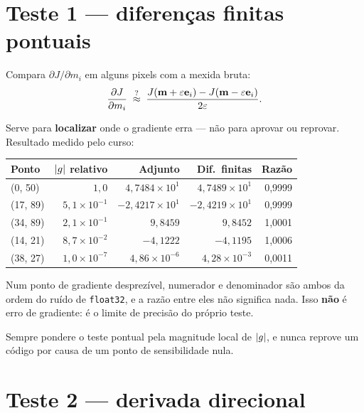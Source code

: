 \documentclass[11pt,a4paper,oneside]{report}
\begin{document}
\section{Teste 1 --- diferen\c{c}as finitas pontuais}

Compara $\partial J/\partial m_i$ em alguns pixels com a mexida bruta:
\begin{equation}
\frac{\partial J}{\partial m_i} \;\stackrel{?}{\approx}\;
\frac{J(\mathbf{m} + \varepsilon\mathbf{e}_i) - J(\mathbf{m} - \varepsilon\mathbf{e}_i)}
     {2\varepsilon}.
\end{equation}

Serve para \textbf{localizar} onde o gradiente erra --- n\~ao para aprovar ou
reprovar. Resultado medido pelo curso:

\begin{center}
\begin{tabular}{@{}lrrrr@{}}
\toprule
\textbf{Ponto} & $\lvert g \rvert$ relativo & \textbf{Adjunto} & \textbf{Dif.\ finitas}
& \textbf{Raz\~ao} \\
\midrule
(0, 50)  & $1{,}0$              & $4{,}7484\times10^{1}$  & $4{,}7489\times10^{1}$  & 0{,}9999 \\
(17, 89) & $5{,}1\times10^{-1}$ & $-2{,}4217\times10^{1}$ & $-2{,}4219\times10^{1}$ & 0{,}9999 \\
(34, 89) & $2{,}1\times10^{-1}$ & $9{,}8459$              & $9{,}8452$              & 1{,}0001 \\
(14, 21) & $8{,}7\times10^{-2}$ & $-4{,}1222$             & $-4{,}1195$             & 1{,}0006 \\
(38, 27) & $1{,}0\times10^{-7}$ & $4{,}86\times10^{-6}$   & $4{,}28\times10^{-3}$   & 0{,}0011 \\
\bottomrule
\end{tabular}
\end{center}

\begin{atencao}
Num ponto de gradiente desprez\'ivel, numerador e denominador s\~ao ambos da
ordem do ru\'ido de \texttt{float32}, e a raz\~ao entre eles n\~ao significa
nada. Isso \textbf{n\~ao} \'e erro de gradiente: \'e o limite de precis\~ao do
pr\'oprio teste.

Sempre pondere o teste pontual pela magnitude local de $\lvert g \rvert$, e nunca
reprove um c\'odigo por causa de um ponto de sensibilidade nula.
\end{atencao}

\section{Teste 2 --- derivada direcional}
\end{document}
